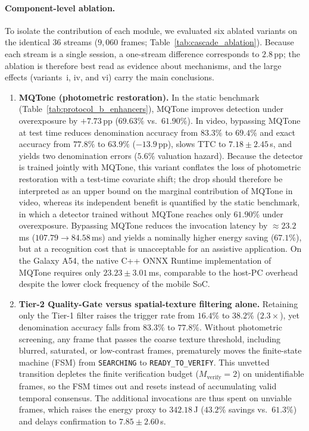 \documentclass[final,5p,times,twocolumn,authoryear]{elsarticle}
\begin{document}
\paragraph{Component-level ablation.}
To isolate the contribution of each module, we evaluated six ablated variants on the identical 36 streams ($9{,}060$ frames; Table~\ref{tab:cascade_ablation}). Because each stream is a single session, a one-stream difference corresponds to $2.8$\,pp; the ablation is therefore best read as evidence about mechanisms, and the large effects (variants~i, iv, and vi) carry the main conclusions.
\begin{enumerate}[label=(\roman*)]
    \item \textbf{MQTone (photometric restoration).} In the static benchmark (Table~\ref{tab:protocol_b_enhancers}), MQTone improves detection under overexposure by $+7.73$\,pp ($69.63\%$ vs.\ $61.90\%$). In video, bypassing MQTone at test time reduces denomination accuracy from $83.3\%$ to $69.4\%$ and exact accuracy from $77.8\%$ to $63.9\%$ ($-13.9$\,pp), slows TTC to $7.18 \pm 2.45$\,s, and yields two denomination errors ($5.6\%$ valuation hazard). Because the detector is trained jointly with MQTone, this variant conflates the loss of photometric restoration with a test-time covariate shift; the drop should therefore be interpreted as an upper bound on the marginal contribution of MQTone in video, whereas its independent benefit is quantified by the static benchmark, in which a detector trained without MQTone reaches only $61.90\%$ under overexposure. Bypassing MQTone reduces the invocation latency by $\approx 23.2$\,ms ($107.79 \to 84.58$\,ms) and yields a nominally higher energy saving ($67.1\%$), but at a recognition cost that is unacceptable for an assistive application. On the Galaxy A54, the native C++ ONNX Runtime implementation of MQTone requires only $23.23 \pm 3.01$\,ms, comparable to the host-PC overhead despite the lower clock frequency of the mobile SoC.
    \item \textbf{Tier-2 Quality-Gate versus spatial-texture filtering alone.} Retaining only the Tier-1 filter raises the trigger rate from $16.4\%$ to $38.2\%$ ($2.3\times$), yet denomination accuracy falls from $83.3\%$ to $77.8\%$. Without photometric screening, any frame that passes the coarse texture threshold, including blurred, saturated, or low-contrast frames, prematurely moves the finite-state machine (FSM) from \texttt{SEARCHING} to \texttt{READY\_TO\_VERIFY}. This unvetted transition depletes the finite verification budget ($M_{\text{verify}} = 2$) on unidentifiable frames, so the FSM times out and resets instead of accumulating valid temporal consensus. The additional invocations are thus spent on unviable frames, which raises the energy proxy to $342.18$\,J ($43.2\%$ savings vs.\ $61.3\%$) and delays confirmation to $7.85 \pm 2.60$\,s.

\end{enumerate}
\end{document}
